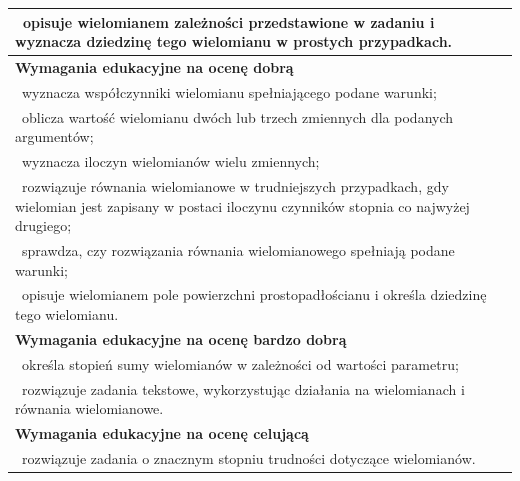\documentclass[12pt,a4paper]{article}
\begin{document}
\begin{longtable}{|p{16cm}|}
		\textbullet\ opisuje wielomianem zależności przedstawione w zadaniu i wyznacza dziedzinę tego wielomianu w prostych przypadkach. \\ \hline
		
		\textbf{Wymagania edukacyjne na ocenę dobrą} \\ \hline
		
		\textbullet\ wyznacza współczynniki wielomianu spełniającego podane warunki; \\
		
		\textbullet\ oblicza wartość wielomianu dwóch lub trzech zmiennych dla podanych argumentów; \\
		
		\textbullet\ wyznacza iloczyn wielomianów wielu zmiennych; \\
		
		\textbullet\ rozwiązuje równania wielomianowe w trudniejszych przypadkach, gdy wielomian jest zapisany w postaci iloczynu czynników stopnia co najwyżej drugiego; \\
		
		\textbullet\ sprawdza, czy rozwiązania równania wielomianowego spełniają podane warunki; \\
		
		\textbullet\ opisuje wielomianem pole powierzchni prostopadłościanu i określa dziedzinę tego wielomianu. \\ \hline
		
		\textbf{Wymagania edukacyjne na ocenę bardzo dobrą} \\ \hline
		
		\textbullet\ określa stopień sumy wielomianów w zależności od wartości parametru; \\
		
		\textbullet\ rozwiązuje zadania tekstowe, wykorzystując działania na wielomianach i równania wielomianowe. \\ \hline
		
		\textbf{Wymagania edukacyjne na ocenę celującą} \\ \hline
		
		\textbullet\ rozwiązuje zadania o znacznym stopniu trudności dotyczące wielomianów. \\ \hline
		
	\end{longtable}
	
\end{document}
